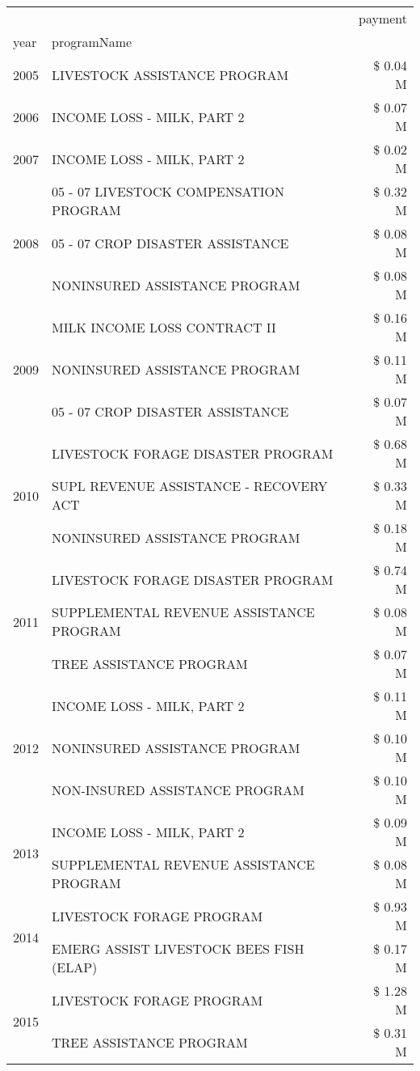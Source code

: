 \begin{tabular}{llr}
\toprule
 &  & payment \\
year & programName &  \\
\midrule
2005 & LIVESTOCK ASSISTANCE PROGRAM & \$ 0.04 M \\
\cline{1-3}
2006 & INCOME LOSS - MILK, PART 2 & \$ 0.07 M \\
\cline{1-3}
2007 & INCOME LOSS - MILK, PART 2 & \$ 0.02 M \\
\cline{1-3}
\multirow[t]{3}{*}{2008} & 05 - 07 LIVESTOCK COMPENSATION PROGRAM & \$ 0.32 M \\
 & 05 - 07 CROP DISASTER ASSISTANCE & \$ 0.08 M \\
 & NONINSURED ASSISTANCE PROGRAM & \$ 0.08 M \\
\cline{1-3}
\multirow[t]{3}{*}{2009} & MILK INCOME LOSS CONTRACT II & \$ 0.16 M \\
 & NONINSURED ASSISTANCE PROGRAM & \$ 0.11 M \\
 & 05 - 07 CROP DISASTER ASSISTANCE & \$ 0.07 M \\
\cline{1-3}
\multirow[t]{3}{*}{2010} & LIVESTOCK FORAGE DISASTER PROGRAM & \$ 0.68 M \\
 & SUPL REVENUE ASSISTANCE - RECOVERY ACT & \$ 0.33 M \\
 & NONINSURED ASSISTANCE PROGRAM & \$ 0.18 M \\
\cline{1-3}
\multirow[t]{3}{*}{2011} & LIVESTOCK FORAGE DISASTER PROGRAM & \$ 0.74 M \\
 & SUPPLEMENTAL REVENUE ASSISTANCE PROGRAM & \$ 0.08 M \\
 & TREE ASSISTANCE PROGRAM & \$ 0.07 M \\
\cline{1-3}
\multirow[t]{3}{*}{2012} & INCOME LOSS - MILK, PART 2 & \$ 0.11 M \\
 & NONINSURED ASSISTANCE PROGRAM & \$ 0.10 M \\
 & NON-INSURED ASSISTANCE PROGRAM & \$ 0.10 M \\
\cline{1-3}
\multirow[t]{2}{*}{2013} & INCOME LOSS - MILK, PART 2 & \$ 0.09 M \\
 & SUPPLEMENTAL REVENUE ASSISTANCE PROGRAM & \$ 0.08 M \\
\cline{1-3}
\multirow[t]{2}{*}{2014} & LIVESTOCK FORAGE PROGRAM & \$ 0.93 M \\
 & EMERG ASSIST LIVESTOCK BEES FISH (ELAP) & \$ 0.17 M \\
\cline{1-3}
\multirow[t]{3}{*}{2015} & LIVESTOCK FORAGE PROGRAM & \$ 1.28 M \\
 & TREE ASSISTANCE PROGRAM & \$ 0.31 M \\

\end{tabular}
